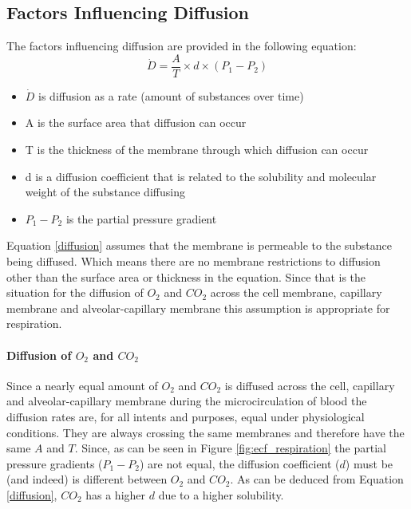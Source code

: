 \subsection{Factors Influencing Diffusion}

The factors influencing diffusion are provided in the following equation:
\vspace{4 mm}
\begin{equation}
    \dot{D} = \frac{A}{T} \times d \times (P_1 - P_2)
    \label{diffusion}
\end{equation}
\vspace{4mm}

\begin{itemize}
    \item $\dot{D}$ is diffusion as a rate (amount of substances over time)
    \item A is the surface area that diffusion can occur
    \item T is the thickness of the membrane through which diffusion can occur
    \item d is a diffusion coefficient that is related to the solubility and molecular weight of the substance diffusing
    \item $P_1 - P_2$ is the partial pressure gradient
\end{itemize}

Equation \ref{diffusion} assumes that the membrane is permeable to the substance being diffused. Which means there are no membrane restrictions to diffusion other than the surface area or thickness in the equation. Since that is the situation for the diffusion of $O_2$ and $CO_2$ across the cell membrane, capillary membrane and alveolar-capillary membrane this assumption is appropriate for respiration.

\paragraph{Diffusion of $O_2$ and $CO_2$}

Since a nearly equal amount of $O_2$ and $CO_2$ is diffused across the cell, capillary and alveolar-capillary membrane during the microcirculation of blood the diffusion rates are, for all intents and purposes, equal under physiological conditions. They are always crossing the same membranes and therefore have the same $A$ and $T$. Since, as can be seen in Figure \ref{fig:ecf_respiration} the partial pressure gradients ($P_1 - P_2$) are not equal, the diffusion coefficient ($d$) must be (and indeed) is different between $O_2$ and $CO_2$. As can be deduced from Equation \ref{diffusion}, $CO_2$ has a higher $d$ due to a higher solubility.\footnotemark{}

